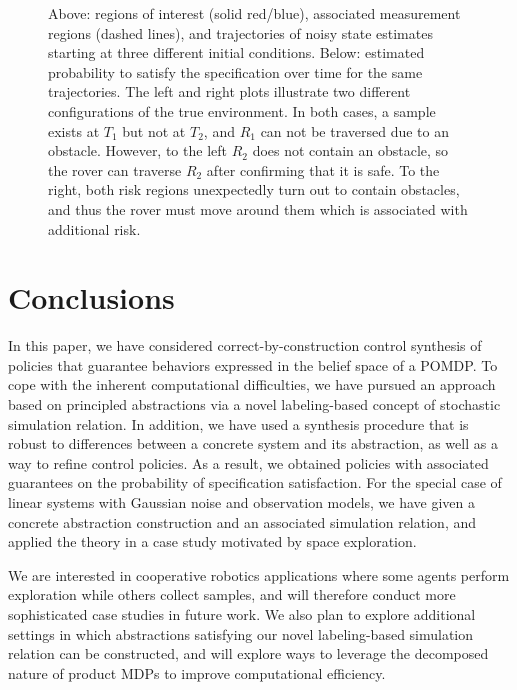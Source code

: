 \documentclass{ifacconf}
\begin{document}
\begin{figure}
  \footnotesize
  \setlength{}
  \setlength{}

  \begin{center}
       
  \end{center}

  \setlength{}
  \setlength{}

  \begin{center}
       
  \end{center}
  \caption{Above: regions of interest (solid red/blue), associated measurement regions (dashed lines), and trajectories of noisy state estimates starting at three different initial conditions. Below: estimated probability to satisfy the specification over time for the same trajectories. The left and right plots illustrate two different configurations of the true environment. In both cases, a sample exists at $T_1$ but not at $T_2$, and $R_1$ can not be traversed due to an obstacle. However, to the left $R_2$ does not contain an obstacle, so the rover can traverse $R_2$ after confirming that it is safe. To the right, both risk regions unexpectedly turn out to contain obstacles, and thus the rover must move around them which is associated with additional risk.}
  \label{fig:exp1}
\end{figure}


\section{Conclusions}
\label{sec:conclusions}

In this paper,  we have considered correct-by-construction control synthesis of policies that guarantee behaviors expressed in the belief space of a POMDP. To cope with the inherent computational difficulties, we have pursued an approach based on principled abstractions via a novel labeling-based concept of stochastic simulation relation. In addition, we have used a synthesis procedure that is robust to differences between a concrete system and its abstraction, as well as a way to refine control policies. As a result, we obtained policies with associated guarantees on the probability of specification satisfaction. For the special case of linear systems with Gaussian noise and observation models, we have given a concrete abstraction construction and an associated simulation relation, and applied the theory in a case study motivated by space exploration. 

We are interested in cooperative robotics applications where some agents perform exploration while others collect samples, and will therefore conduct more sophisticated case studies in future work. We also plan to explore additional settings in which abstractions satisfying our novel labeling-based simulation relation can be constructed, and will explore ways to leverage the decomposed nature of product MDPs to improve computational efficiency.


\end{document}
